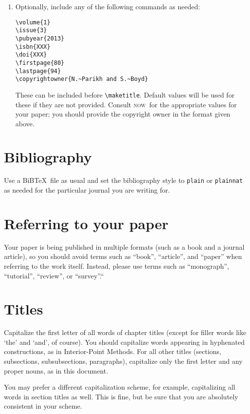 \documentclass[openany]{now} %
\newcommand{\now}{\textsc{now}}
\begin{document}
\begin{enumerate}
\item Optionally, include any of the following commands as needed:

\begin{verbatim}
\volume{1}
\issue{3}
\pubyear{2013}
\isbn{XXX}
\doi{XXX}
\firstpage{80}
\lastpage{94}
\copyrightowner{N.~Parikh and S.~Boyd}
\end{verbatim}

These can be included before \texttt{\textbackslash maketitle}. Default values
will be used for these if they are not provided. Consult \now\ for the
appropriate values for your paper; you should provide the copyright owner in
the format given above.
\end{enumerate}


\section{Bibliography}

Use a BiB\TeX\ file as usual and set the bibliography style to
\texttt{plain} or \texttt{plainnat} as needed for the particular
journal you are writing for.

\section{Referring to your paper}

Your paper is being published in multiple formats (such as a book and a journal
article), so you should avoid terms such as ``book'', ``article'', and ``paper''
when referring to the work itself. Instead, please use terms such as ``monograph'',
``tutorial'', ``review'', or ``survey''.`` 

\section{Titles}

Capitalize the first letter of all words of chapter titles 
(except for filler words like `the' and `and', of course). 
You should capitalize words appearing in hyphenated constructions, as in
Interior-Point Methods.
For all other titles (sections, subsections, subsubsections, paragraphs),
capitalize only the first letter and any proper nouns, as in this document.

You may prefer a different capitalization scheme, for example, 
capitalizing all words in section titles as well. This is fine, but be sure that
you are absolutely consistent in your scheme.
\end{document}
